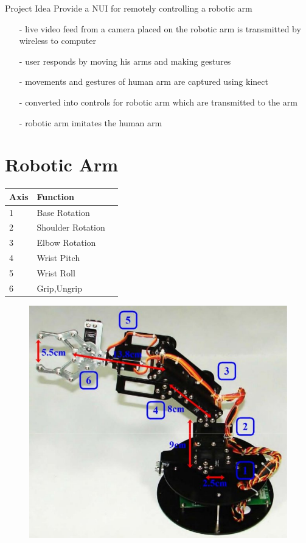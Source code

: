 \documentclass{beamer}
\begin{document}
\begin{frame}{Project Idea}
Provide a NUI for remotely controlling  a robotic arm
\begin{itemize}
\item[-]live video feed from a camera placed on the robotic arm is transmitted by wireless to computer
\item[-]user responds by moving his arms and making gestures
\item[-]movements and gestures of human arm are captured using kinect
\item[-]converted into controls for robotic arm which are transmitted to the arm
\item[-]robotic arm imitates the human arm
\end{itemize}
\end{frame}

\section{Robotic Arm}
\begin{frame}
  \begin{table}
  \begin{tabular}{|l|l|l|}
      \hline
      Axis & Function\\
      \hline
      1 & Base Rotation\\
      2 & Shoulder Rotation\\
      3 & Elbow Rotation\\
      4 & Wrist Pitch\\
      5 & Wrist Roll\\
      6 & Grip,Ungrip\\
      \hline
    \end{tabular}
    \end{table}
  \begin{figure}
      \includegraphics[scale = .2]{arm-axes.jpg}
  \end{figure}      
  
  
\end{frame}
\end{document}
